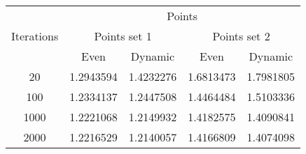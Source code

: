 \begin{center}
	\begin{tabular}{|c|c|c|c|c|}
		\hline
		\multirow{3}{*}{Iterations}	&	\multicolumn{4}{c|}{Points}	\\
										\cline{2-5}
									&	\multicolumn{2}{c|}{Points set 1}	& \multicolumn{2}{c|}{Points set 2} \\
										\cline{2-5}
									&	Even			&	Dynamic			&	Even			&	Dynamic		\\
		\hline								
		20							& 1.2943594 		& 1.4232276			& 1.6813473 		& 1.7981805		\\
		\hline
		100							& 1.2334137 		& 1.2447508 		& 1.4464484 		& 1.5103336		\\
		\hline
		1000						& 1.2221068 		& 1.2149932 		& 1.4182575 		& 1.4090841		\\
		\hline
		2000						& 1.2216529 		& 1.2140057 		& 1.4166809 		& 1.4074098		\\
		\hline
	\end{tabular}
	\label{tab:selection_type}
\end{center}
